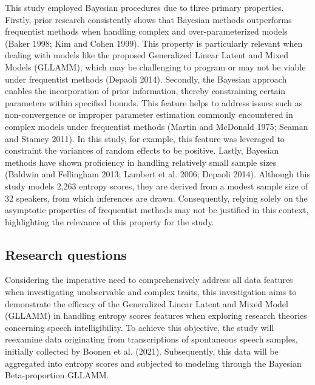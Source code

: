 \documentclass[
sn-apacite
]{sn-jnl}
\begin{document}
{This study employed Bayesian procedures due to three primary
properties. Firstly, prior research consistently shows that Bayesian
methods outperforms frequentist methods when handling complex and
over-parameterized models (Baker 1998; Kim and Cohen 1999). This
property is particularly relevant when dealing with models like the
proposed Generalized Linear Latent and Mixed Models (GLLAMM), which may
be challenging to program or may not be viable under frequentist methods
(Depaoli 2014). Secondly, the Bayesian approach enables the
incorporation of prior information, thereby constraining certain
parameters within specified bounds. This feature helps to address issues
such as non-convergence or improper parameter estimation commonly
encountered in complex models under frequentist methods (Martin and
McDonald 1975; Seaman and Stamey 2011). In this study, for example, this
feature was leveraged to constraint the variances of random effects to
be positive. Lastly, Bayesian methods have shown proficiency in handling
relatively small sample sizes (Baldwin and Fellingham 2013; Lambert et
al. 2006; Depaoli 2014). Although this study models 2,263 entropy
scores, they are derived from a modest sample size of 32 speakers, from
which inferences are drawn. Consequently, relying solely on the
asymptotic properties of frequentist methods may not be justified in
this context, highlighting the relevance of this property for the
study.}

\subsection{Research questions}\label{sec-I-RQ}

Considering the imperative need to comprehensively address all data
features when investigating unobservable and complex traits, this
investigation aims to demonstrate the efficacy of the Generalized Linear
Latent and Mixed Model (GLLAMM) in handling entropy scores features when
exploring research theories concerning speech intelligibility. To
achieve this objective, the study will reexamine data originating from
transcriptions of spontaneous speech samples, initially collected by
Boonen et al. (2021). Subsequently, this data will be aggregated into
entropy scores and subjected to modeling through the Bayesian
Beta-proportion GLLAMM.
\end{document}
